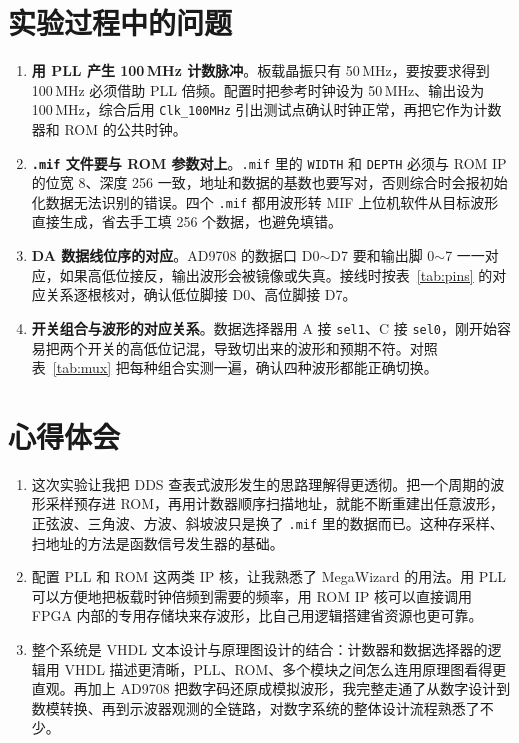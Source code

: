 \documentclass[12pt]{ctexart}
\begin{document}
\section{实验过程中的问题}

\begin{enumerate}
    \item \textbf{用 PLL 产生 100\,MHz 计数脉冲}。板载晶振只有 50\,MHz，要按要求得到 100\,MHz 必须借助 PLL 倍频。配置时把参考时钟设为 50\,MHz、输出设为 100\,MHz，综合后用 \texttt{Clk\_100MHz} 引出测试点确认时钟正常，再把它作为计数器和 ROM 的公共时钟。
    \item \textbf{\texttt{.mif} 文件要与 ROM 参数对上}。\texttt{.mif} 里的 \texttt{WIDTH} 和 \texttt{DEPTH} 必须与 ROM IP 的位宽 8、深度 256 一致，地址和数据的基数也要写对，否则综合时会报初始化数据无法识别的错误。四个 \texttt{.mif} 都用波形转 MIF 上位机软件从目标波形直接生成，省去手工填 256 个数据，也避免填错。
    \item \textbf{DA 数据线位序的对应}。AD9708 的数据口 D0$\sim$D7 要和输出脚 0$\sim$7 一一对应，如果高低位接反，输出波形会被镜像或失真。接线时按表~\ref{tab:pins} 的对应关系逐根核对，确认低位脚接 D0、高位脚接 D7。
    \item \textbf{开关组合与波形的对应关系}。数据选择器用 A 接 \texttt{sel1}、C 接 \texttt{sel0}，刚开始容易把两个开关的高低位记混，导致切出来的波形和预期不符。对照表~\ref{tab:mux} 把每种组合实测一遍，确认四种波形都能正确切换。
\end{enumerate}

\section{心得体会}

\begin{enumerate}
    \item 这次实验让我把 DDS 查表式波形发生的思路理解得更透彻。把一个周期的波形采样预存进 ROM，再用计数器顺序扫描地址，就能不断重建出任意波形，正弦波、三角波、方波、斜坡波只是换了 \texttt{.mif} 里的数据而已。这种存采样、扫地址的方法是函数信号发生器的基础。
    \item 配置 PLL 和 ROM 这两类 IP 核，让我熟悉了 MegaWizard 的用法。用 PLL 可以方便地把板载时钟倍频到需要的频率，用 ROM IP 核可以直接调用 FPGA 内部的专用存储块来存波形，比自己用逻辑搭建省资源也更可靠。
    \item 整个系统是 VHDL 文本设计与原理图设计的结合：计数器和数据选择器的逻辑用 VHDL 描述更清晰，PLL、ROM、多个模块之间怎么连用原理图看得更直观。再加上 AD9708 把数字码还原成模拟波形，我完整走通了从数字设计到数模转换、再到示波器观测的全链路，对数字系统的整体设计流程熟悉了不少。
\end{enumerate}
\end{document}
